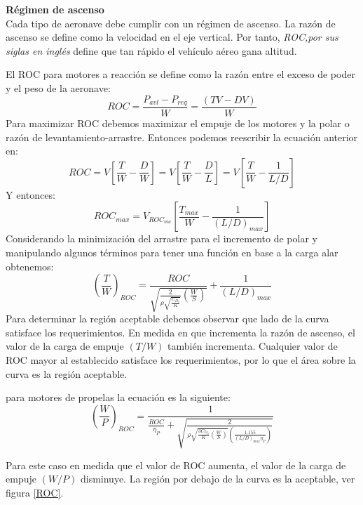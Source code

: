 \bigskip
\textbf{Régimen  de ascenso}\\
Cada tipo de aeronave debe cumplir con un régimen de ascenso.
La razón de ascenso se define como la velocidad en el eje vertical.
Por tanto, \textit{ROC,por sus siglas en inglés} define que tan rápido el vehículo aéreo gana altitud. 

El ROC para motores a reacción se define como la razón entre el exceso de poder y el peso de la aeronave:
\begin{equation}
    ROC = \frac{P_{avl} - P_{req}}{W} = \frac{(TV - DV)}{W}
\end{equation}
Para maximizar ROC debemos maximizar el empuje de los motores y la polar o razón de levantamiento-arrastre. Entonces podemos reescribir la ecuación anterior en:
\begin{equation}
    ROC = V[\frac{T}{W} - \frac{D}{W}] =  V[\frac{T}{W} - \frac{D}{L}] = V[\frac{T}{W} - \frac{1}{L/D}]
\end{equation}
Y entonces:
\begin{equation}
    ROC_{max} = V_{ROC_{ma}}[\frac{T_{max}}{W}-\frac{1}{(L/D)_{max}}]
\end{equation}
Considerando la minimización del arrastre para el incremento de polar y manipulando algunos términos para tener una función en base a la carga alar obtenemos:
\begin{equation}
    (\frac{T}{W})_{ROC} = \frac{ROC}{\sqrt{\frac{2}{\rho \sqrt{\frac{C_{D_0}}{K}}}(\frac{W}{S})}} + \frac{1}{(L/D)_{max}}
\end{equation}
Para determinar la región aceptable debemos observar que lado de la curva satisface los requerimientos. 
En medida en que incrementa la razón de ascenso, el valor de la carga de empuje $(T/W)$ también incrementa. 
Cualquier valor de ROC mayor al establecido satisface los requerimientos, por lo que el área sobre la curva es la región aceptable. 

para motores de propelas la ecuación es la siguiente:
\begin{equation}
    (\frac{W}{P})_{ROC} = \frac{1}{\frac{ROC}{\eta_{P}} + \sqrt{\frac{2}{\rho \sqrt{\frac{3 C_{D_0}}{K} (\frac{W}{S})} (\frac{1.155}{(L/D)_{max} \eta_P})}}}
\end{equation}

Para este caso en medida que el valor de ROC aumenta, el valor de la carga de empuje $(W/P)$ disminuye. La región por debajo de la curva es la aceptable, ver figura \ref{ROC}. 

